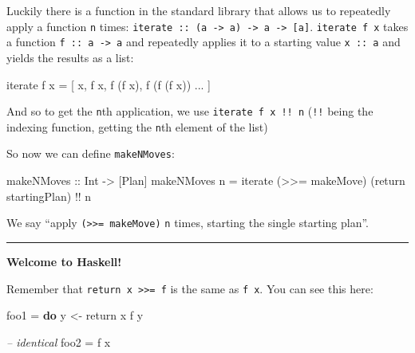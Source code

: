 \documentclass[]{article}
\newenvironment{Shaded}{}{}
\newcommand{\CommentTok}[1]{\textcolor[rgb]{0.38,0.63,0.69}{\textit{#1}}}
\newcommand{\DataTypeTok}[1]{\textcolor[rgb]{0.56,0.13,0.00}{#1}}
\newcommand{\FunctionTok}[1]{\textcolor[rgb]{0.02,0.16,0.49}{#1}}
\newcommand{\KeywordTok}[1]{\textcolor[rgb]{0.00,0.44,0.13}{\textbf{#1}}}
\newcommand{\NormalTok}[1]{#1}
\newcommand{\OtherTok}[1]{\textcolor[rgb]{0.00,0.44,0.13}{#1}}
\begin{document}
Luckily there is a function in the standard library that allows us to repeatedly
apply a function \texttt{n} times:
\texttt{iterate\ ::\ (a\ -\textgreater{}\ a)\ -\textgreater{}\ a\ -\textgreater{}\ {[}a{]}}.
\texttt{iterate\ f\ x} takes a function \texttt{f\ ::\ a\ -\textgreater{}\ a}
and repeatedly applies it to a starting value \texttt{x\ ::\ a} and yields the
results as a list:

\begin{Shaded}
\begin{Highlighting}[]
\NormalTok{iterate f x }\FunctionTok{=}\NormalTok{ [ x, f x, f (f x), f (f (f x)) }\FunctionTok{...}\NormalTok{ ]}
\end{Highlighting}
\end{Shaded}

And so to get the \texttt{n}th application, we use \texttt{iterate\ f\ x\ !!\ n}
(\texttt{!!} being the indexing function, getting the \texttt{n}th element of
the list)

So now we can define \texttt{makeNMoves}:

\begin{Shaded}
\begin{Highlighting}[]
\OtherTok{makeNMoves ::} \DataTypeTok{Int} \OtherTok{->}\NormalTok{ [}\DataTypeTok{Plan}\NormalTok{]}
\NormalTok{makeNMoves n }\FunctionTok{=}\NormalTok{ iterate (}\FunctionTok{>>=}\NormalTok{ makeMove) (return startingPlan) }\FunctionTok{!!}\NormalTok{ n}
\end{Highlighting}
\end{Shaded}

We say ``apply \texttt{(\textgreater{}\textgreater{}=\ makeMove)} \texttt{n}
times, starting the single starting plan''.

\begin{center}\rule{0.5\linewidth}{\linethickness}\end{center}

\textbf{Welcome to Haskell!}

Remember that \texttt{return\ x\ \textgreater{}\textgreater{}=\ f} is the same
as \texttt{f\ x}. You can see this here:

\begin{Shaded}
\begin{Highlighting}[]
\NormalTok{foo1 }\FunctionTok{=} \KeywordTok{do}
\NormalTok{    y }\OtherTok{<-}\NormalTok{ return x}
\NormalTok{    f y}

\CommentTok{-- identical}
\NormalTok{foo2 }\FunctionTok{=}\NormalTok{ f x}
\end{Highlighting}
\end{Shaded}
\end{document}
